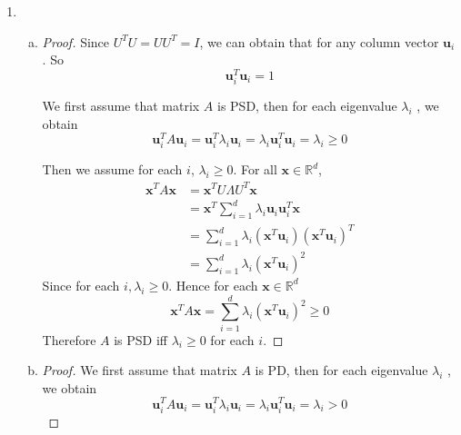 \documentclass[12pt]{article}
\newcommand{\R}{\mathbb{R}}
\renewcommand{\vec}[1]{\mathbf{#1}}
\begin{document}
\begin{enumerate}[1)]
\begin{enumerate}[(a)]
\begin{enumerate}[(i)]
           	\begin{proof} We can obtain that
            	$$P(H=h) = \sum_{d}P(H=h,D=d)$$
                For any $d, P(H=h, D=d) \geq 0$,
                
                Therefore $P(H=h) = \sum_{d}P(H=h,D=d) \geq P(H=h,D=d)$.
            \end{proof}
            \item It depends. 
            
            Since $P(H=h|D=d) = \frac{P(H=h, D=d)}{P(D=d)}$ and we can't decide the value of $P(D=d) \in (0, 1) $, it depends.
           	\item It depends,
            $$ P(H=h|D=d) = \frac{P(H=h, D=d)}{P(D=d)} $$
            $$ P(D=d|H=h)P(H=h) = P(D=d)$$
            There is no definite inequality between these two expressions.
        \end{enumerate}
    \end{enumerate}
    \item
    \begin{enumerate}[(a)]
    	\item 
        \begin{proof}
        	Since $U^{T}U = UU^{T} = I$, we can obtain that for any column vector $\mathbf{u}_{i}$. So$$\vec{u}_{i}^{T}\vec{u}_{i} = 1$$
            
            We first assume that matrix $A$ is PSD, then for each eigenvalue $\lambda_{i}$ , we obtain
            $$\vec{u}_{i}^{T}A\vec{u}_{i} = \vec{u}_{i}^{T}\lambda_{i}\vec{u}_{i} = \lambda_{i}\vec{u}_{i}^{T}\vec{u}_{i}  = \lambda_{i} \geq 0$$
                   
            Then we assume for each $i$, $\lambda_{i} \geq 0$. For all $\vec{x} \in \R^{d}$,
            \begin{align*}
           \vec{x}^{T}A\vec{x} & = \vec{x}^{T}U\Lambda U^{T} \vec{x}\\
           & = \vec{x}^{T}\sum_{i=1}^{d}\lambda_{i}\vec{u}_{i}\vec{u}_{i}^{T}\vec{x} \\
           &=  \sum_{i=1}^{d}\lambda_{i}(\vec{x}^{T}\vec{u}_{i})(\vec{x}^{T}\vec{u}_{i})^{T} \\
           & = \sum_{i=1}^{d}\lambda_{i}(\vec{x}^{T}\vec{u}_{i})^{2}
           \end{align*}
           Since for each $i, \lambda_{i} \geq 0$.  Hence for each $\vec{x} \in \R^{d}$
           $$\vec{x}^{T}A\vec{x}  = \sum_{i=1}^{d}\lambda_{i}(\vec{x}^{T}\vec{u}_{i})^{2}\geq 0$$
           Therefore $A$ is PSD iff $\lambda_{i} \geq 0$ for each $i$.
        \end{proof}
        \item
        \begin{proof}
        	We first assume that matrix $A$ is PD, then for each eigenvalue $\lambda_{i}$ , we obtain
            $$\vec{u}_{i}^{T}A\vec{u}_{i} = \vec{u}_{i}^{T}\lambda_{i}\vec{u}_{i} = \lambda_{i}\vec{u}_{i}^{T}\vec{u}_{i}  = \lambda_{i} > 0$$
             

\end{proof}
\end{enumerate}
\end{enumerate}
\end{document}
